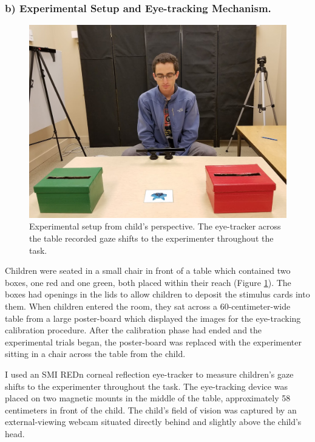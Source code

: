 \documentclass[floatsintext,man]{apa6}
\theoremstyle{definition}
\theoremstyle{definition}
\theoremstyle{definition}
\theoremstyle{remark}
\begin{document}
\subsubsection{b) Experimental Setup and Eye-tracking
Mechanism.}\label{b-experimental-setup-and-eye-tracking-mechanism.}

\begin{figure}
\centering
\includegraphics{../images/setup.jpg}
\caption{\label{fig:setup}Experimental setup from child's perspective. The
eye-tracker across the table recorded gaze shifts to the experimenter
throughout the task.}
\end{figure}

Children were seated in a small chair in front of a table which
contained two boxes, one red and one green, both placed within their
reach (Figure \ref{fig:setup}). The boxes had openings in the lids to
allow children to deposit the stimulus cards into them. When children
entered the room, they sat across a 60-centimeter-wide table from a
large poster-board which displayed the images for the eye-tracking
calibration procedure. After the calibration phase had ended and the
experimental trials began, the poster-board was replaced with the
experimenter sitting in a chair across the table from the child.

I used an SMI REDn corneal reflection eye-tracker to measure children's
gaze shifts to the experimenter throughout the task. The eye-tracking
device was placed on two magnetic mounts in the middle of the table,
approximately 58 centimeters in front of the child. The child's field of
vision was captured by an external-viewing webcam situated directly
behind and slightly above the child's head.
\end{document}
